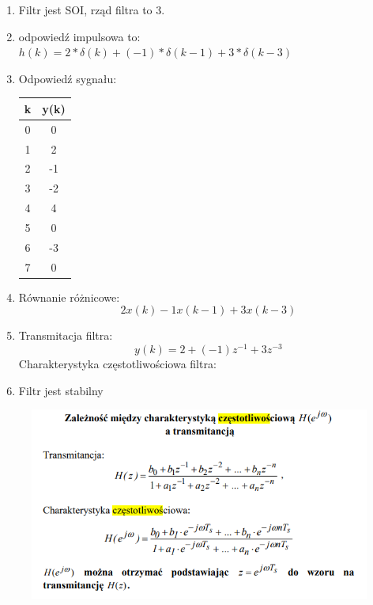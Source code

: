 \documentclass[10pt,a4paper,twoside,twocolumn]{article}%
\begin{document}
\begin{mdframed}[backgroundcolor=gray!20,roundcorner=7pt]
    \begin{enumerate}[label=\alph*)]
        \item Filtr jest SOI, rząd filtra to 3. 
        \item odpowiedź impulsowa to: $h(k) = 2*\delta(k) + (-1)*\delta(k-1) + 3*\delta(k-3)$ 
        \item Odpowiedź sygnału:
            \begin{table}[H]
                \centering
                \begin{tabular}{|c|c|}
                    \hline
                    k & y(k) \\ \hline
                    0 & 0 \\ \hline
                    1 & 2 \\ \hline
                    2 & -1 \\ \hline
                    3 & -2 \\ \hline
                    4 & 4 \\ \hline
                    5 & 0 \\ \hline
                    6 & -3 \\ \hline
                    7 & 0 \\ \hline
                \end{tabular}
            \end{table}
        \item Równanie różnicowe:$$2x(k)-1x(k-1)+3x(k-3)$$
            
        \item Transmitacja filtra:$$y(k) = 2 + (-1)z^{-1} + 3z^{-3}$$
            Charakterystyka częstotliwościowa filtra:$$$$
            
        \item Filtr jest stabilny
    \end{enumerate}
\end{mdframed}
\begin{figure}[H]
    \centering
    \includegraphics[width=1\linewidth]{image.png}
\end{figure}
\end{document}
